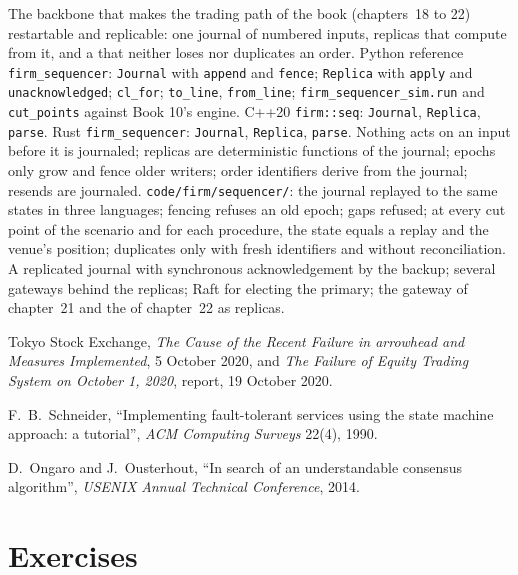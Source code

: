 \begin{build}
 The backbone that makes the trading path of the book (chapters~18 to 22) restartable and replicable: one
journal of numbered inputs, replicas that compute from it, and a  that neither loses nor duplicates an order.
 Python reference \texttt{firm\_sequencer}: \texttt{Journal} with \texttt{append} and \texttt{fence};
\texttt{Replica} with \texttt{apply} and \texttt{unacknowledged}; \texttt{cl\_for}; \texttt{to\_line}, \texttt{from\_line};
\texttt{firm\_sequencer\_sim.run} and \texttt{cut\_points} against Book 10's engine. C++20 \texttt{firm::seq}:
\texttt{Journal}, \texttt{Replica}, \texttt{parse}. Rust \texttt{firm\_sequencer}: \texttt{Journal}, \texttt{Replica},
\texttt{parse}.
 Nothing acts on an input before it is journaled; replicas are deterministic functions of the journal; epochs
only grow and fence older writers; order identifiers derive from the journal; resends are journaled.
 \texttt{code/firm/sequencer/}: the  journal replayed to the same states in three languages;
fencing refuses an old epoch; gaps refused; at every cut point of the scenario and for each procedure, the state equals a replay
and the venue's position; duplicates only with fresh identifiers and without reconciliation.
 A replicated journal with synchronous acknowledgement by the backup; several gateways behind the replicas;
Raft for electing the primary; the gateway of chapter~21 and the  of chapter~22 as replicas.
\end{build}

\begin{omsources}
\item Tokyo Stock Exchange, \emph{The Cause of the Recent Failure in arrowhead and Measures Implemented}, 5 October 2020, and
\emph{The Failure of Equity Trading System on October 1, 2020}, report, 19 October 2020.
\item F.~B.~Schneider, ``Implementing fault-tolerant services using the state machine approach: a tutorial'', \emph{ACM
Computing Surveys} 22(4), 1990.
\item D.~Ongaro and J.~Ousterhout, ``In search of an understandable consensus algorithm'', \emph{USENIX Annual Technical
Conference}, 2014.
\end{omsources}

\section{Exercises}

